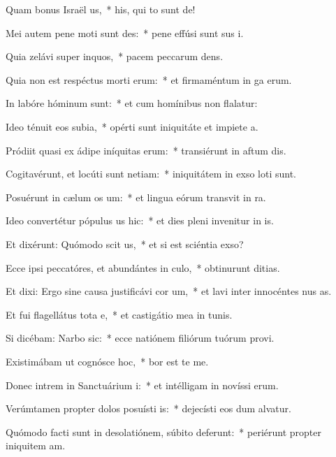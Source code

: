 \item Quam bonus Israël us,~* his, qui to sunt de!
\item Mei autem pene moti sunt des:~* pene effúsi sunt sus i.
\item Quia zelávi super inquos,~* pacem peccarum dens.
\item Quia non est respéctus morti erum:~* et firmaméntum in ga erum.
\item In labóre hóminum  sunt:~* et cum homínibus non flalatur:
\item Ideo ténuit eos subia,~* opérti sunt iniquitáte et impiete a.
\item Pródiit quasi ex ádipe iníquitas erum:~* transiérunt in aftum dis.
\item Cogitavérunt, et locúti sunt netiam:~* iniquitátem in exso loti sunt.
\item Posuérunt in cælum os um:~* et lingua eórum transvit in ra.
\item Ideo convertétur pópulus us hic:~* et dies pleni invenitur in is.
\item Et dixérunt: Quómodo scit us,~* et si est sciéntia  exso?
\item Ecce ipsi peccatóres, et abundántes in culo,~* obtinurunt ditias.
\item Et dixi: Ergo sine causa justificávi cor um,~* et lavi inter innocéntes nus as.
\item Et fui flagellátus tota e,~* et castigátio mea in tunis.
\item Si dicébam: Narbo sic:~* ecce natiónem filiórum tuórum provi.
\item Existimábam ut cognósce hoc,~* bor est te me.
\item Donec intrem in Sanctuárium i:~* et intélligam in novíssi erum.
\item Verúmtamen propter dolos posuísti is:~* dejecísti eos dum alvatur.
\item Quómodo facti sunt in desolatiónem, súbito deferunt:~* periérunt propter iniquitem am.
